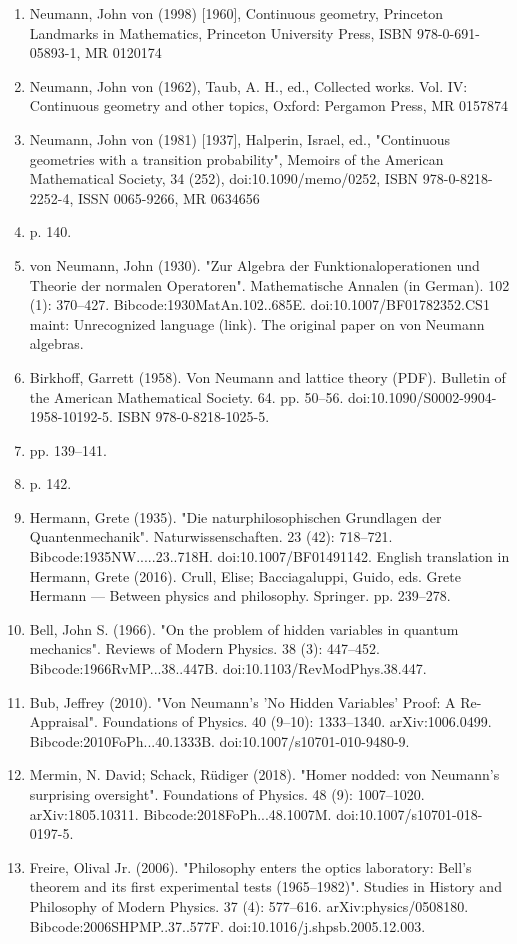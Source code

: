 \begin{enumerate}
\item Neumann, John von (1998) [1960], Continuous geometry, Princeton Landmarks in Mathematics, Princeton University Press, ISBN 978-0-691-05893-1, MR 0120174
\item Neumann, John von (1962), Taub, A. H., ed., Collected works. Vol. IV: Continuous geometry and other topics, Oxford: Pergamon Press, MR 0157874
\item Neumann, John von (1981) [1937], Halperin, Israel, ed., "Continuous geometries with a transition probability", Memoirs of the American Mathematical Society, 34 (252), doi:10.1090/memo/0252, ISBN 978-0-8218-2252-4, ISSN 0065-9266, MR 0634656
\item  p. 140.
\item von Neumann, John (1930). "Zur Algebra der Funktionaloperationen und Theorie der normalen Operatoren". Mathematische Annalen (in German). 102 (1): 370–427. Bibcode:1930MatAn.102..685E. doi:10.1007/BF01782352.CS1 maint: Unrecognized language (link). The original paper on von Neumann algebras.
\item Birkhoff, Garrett (1958). Von Neumann and lattice theory (PDF). Bulletin of the American Mathematical Society. 64. pp. 50–56. doi:10.1090/S0002-9904-1958-10192-5. ISBN 978-0-8218-1025-5.
\item  pp. 139–141.
\item  p. 142.
\item Hermann, Grete (1935). "Die naturphilosophischen Grundlagen der Quantenmechanik". Naturwissenschaften. 23 (42): 718–721. Bibcode:1935NW.....23..718H. doi:10.1007/BF01491142. English translation in Hermann, Grete (2016). Crull, Elise; Bacciagaluppi, Guido, eds. Grete Hermann — Between physics and philosophy. Springer. pp. 239–278.
\item Bell, John S. (1966). "On the problem of hidden variables in quantum mechanics". Reviews of Modern Physics. 38 (3): 447–452. Bibcode:1966RvMP...38..447B. doi:10.1103/RevModPhys.38.447.
\item Bub, Jeffrey (2010). "Von Neumann's 'No Hidden Variables' Proof: A Re-Appraisal". Foundations of Physics. 40 (9–10): 1333–1340. arXiv:1006.0499. Bibcode:2010FoPh...40.1333B. doi:10.1007/s10701-010-9480-9.
\item Mermin, N. David; Schack, Rüdiger (2018). "Homer nodded: von Neumann's surprising oversight". Foundations of Physics. 48 (9): 1007–1020. arXiv:1805.10311. Bibcode:2018FoPh...48.1007M. doi:10.1007/s10701-018-0197-5.
\item Freire, Olival Jr. (2006). "Philosophy enters the optics laboratory: Bell's theorem and its first experimental tests (1965–1982)". Studies in History and Philosophy of Modern Physics. 37 (4): 577–616. arXiv:physics/0508180. Bibcode:2006SHPMP..37..577F. doi:10.1016/j.shpsb.2005.12.003.

\end{enumerate}

